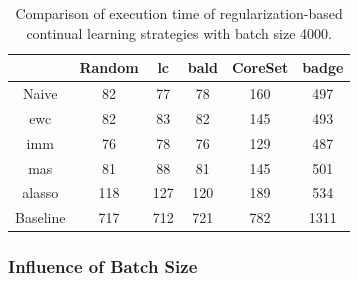 
\begin{table}[h]
    \centering
    \begin{tabular}{c | c c c c c } 
         & Random & \gls{lc} & \gls{bald} & CoreSet & \gls{badge}\\ 
        \hline
        Naive & 82 & 77 & 78 & 160 & 497 \\
        \gls{ewc} & 82 & 83 & 82 & 145 & 493\\
        \gls{imm} & 76 & 78 & 76 & 129 & 487\\
        \gls{mas} & 81 & 88 & 81 & 145 & 501\\
        \gls{alasso} & 118 & 127 & 120 & 189 & 534\\
        \hline 
        Baseline & 717 & 712 & 721 & 782 & 1311 \\
    \end{tabular}
    \caption{Comparison of execution time of regularization-based continual learning strategies
    with batch size 4000.}
    \label{fig:Evaluation:CAL:4000bTime}
\end{table}



\subsubsection{Influence of Batch Size}
\label{sec:Evaluation:Results:CAL:BatchSize}

